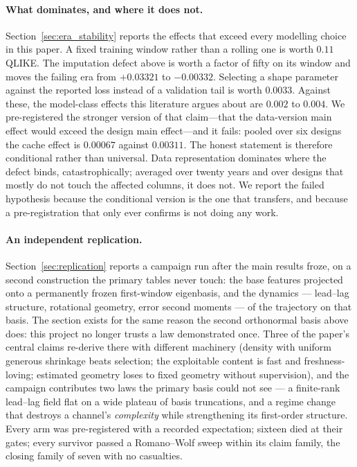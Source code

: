 \paragraph{What dominates, and where it does not.} Section~\ref{sec:era_stability} reports the effects that exceed every modelling choice in this paper. A fixed training window rather than a rolling one is worth $0.11$ QLIKE. The imputation defect above is worth a factor of fifty on its window and moves the failing era from $+0.03321$ to $-0.00332$. Selecting a shape parameter against the reported loss instead of a validation tail is worth $0.0033$. Against these, the model-class effects this literature argues about are $0.002$ to $0.004$. We pre-registered the stronger version of that claim---that the data-version main effect would exceed the design main effect---and it fails: pooled over six designs the cache effect is $0.00067$ against $0.00311$. The honest statement is therefore conditional rather than universal. Data representation dominates where the defect binds, catastrophically; averaged over twenty years and over designs that mostly do not touch the affected columns, it does not. We report the failed hypothesis because the conditional version is the one that transfers, and because a pre-registration that only ever confirms is not doing any work.

\paragraph{An independent replication.} Section~\ref{sec:replication} reports
a campaign run after the main results froze, on a second construction the
primary tables never touch: the base features projected onto a
permanently frozen first-window eigenbasis, and the dynamics --- lead--lag
structure, rotational geometry, error second moments --- of the trajectory on
that basis. The section exists for the same reason the second orthonormal
basis above does: this project no longer trusts a law demonstrated once. Three
of the paper's central claims re-derive there with different machinery
(density with uniform generous shrinkage beats selection; the exploitable
content is fast and freshness-loving; estimated geometry loses to fixed
geometry without supervision), and the campaign contributes two laws the
primary basis could not see --- a finite-rank lead--lag field flat on a wide
plateau of basis truncations, and a regime change that destroys a channel's
\emph{complexity} while strengthening its first-order structure. Every arm was
pre-registered with a recorded expectation; sixteen died at their gates; every
survivor passed a Romano--Wolf sweep within its claim family, the closing
family of seven with no casualties.

